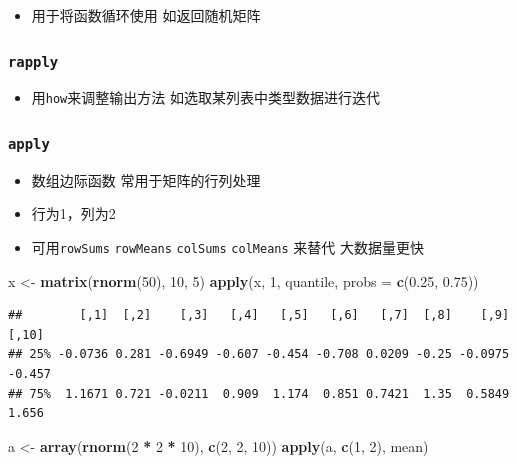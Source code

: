 \documentclass[]{book}
\newenvironment{Shaded}{\begin{snugshade}}{\end{snugshade}}
\newcommand{\DataTypeTok}[1]{\textcolor[rgb]{0.13,0.29,0.53}{#1}}
\newcommand{\DecValTok}[1]{\textcolor[rgb]{0.00,0.00,0.81}{#1}}
\newcommand{\FloatTok}[1]{\textcolor[rgb]{0.00,0.00,0.81}{#1}}
\newcommand{\KeywordTok}[1]{\textcolor[rgb]{0.13,0.29,0.53}{\textbf{#1}}}
\newcommand{\NormalTok}[1]{#1}
\newcommand{\OperatorTok}[1]{\textcolor[rgb]{0.81,0.36,0.00}{\textbf{#1}}}
\newcommand{\StringTok}[1]{\textcolor[rgb]{0.31,0.60,0.02}{#1}}
\providecommand{\tightlist}{%
  \setlength{\itemsep}{0pt}\setlength{\parskip}{0pt}}
\begin{document}
\begin{itemize}
\tightlist
\item
  用于将函数循环使用 如返回随机矩阵
\end{itemize}

\hypertarget{rapply}{%
\subsubsection{\texorpdfstring{\texttt{rapply}}{rapply}}\label{rapply}}

\begin{itemize}
\tightlist
\item
  用\texttt{how}来调整输出方法 如选取某列表中类型数据进行迭代
\end{itemize}

\hypertarget{apply}{%
\subsubsection{\texorpdfstring{\texttt{apply}}{apply}}\label{apply}}

\begin{itemize}
\tightlist
\item
  数组边际函数 常用于矩阵的行列处理
\item
  行为1，列为2
\item
  可用\texttt{rowSums} \texttt{rowMeans} \texttt{colSums} \texttt{colMeans} 来替代 大数据量更快
\end{itemize}

\begin{Shaded}
\begin{Highlighting}[]
\NormalTok{x <-}\StringTok{ }\KeywordTok{matrix}\NormalTok{(}\KeywordTok{rnorm}\NormalTok{(}\DecValTok{50}\NormalTok{), }\DecValTok{10}\NormalTok{, }\DecValTok{5}\NormalTok{)}
\KeywordTok{apply}\NormalTok{(x, }\DecValTok{1}\NormalTok{, quantile, }\DataTypeTok{probs =} \KeywordTok{c}\NormalTok{(}\FloatTok{0.25}\NormalTok{, }\FloatTok{0.75}\NormalTok{))}
\end{Highlighting}
\end{Shaded}

\begin{verbatim}
##        [,1]  [,2]    [,3]   [,4]   [,5]   [,6]   [,7]  [,8]    [,9]  [,10]
## 25% -0.0736 0.281 -0.6949 -0.607 -0.454 -0.708 0.0209 -0.25 -0.0975 -0.457
## 75%  1.1671 0.721 -0.0211  0.909  1.174  0.851 0.7421  1.35  0.5849  1.656
\end{verbatim}

\begin{Shaded}
\begin{Highlighting}[]
\NormalTok{a <-}\StringTok{ }\KeywordTok{array}\NormalTok{(}\KeywordTok{rnorm}\NormalTok{(}\DecValTok{2} \OperatorTok{*}\StringTok{ }\DecValTok{2} \OperatorTok{*}\StringTok{ }\DecValTok{10}\NormalTok{), }\KeywordTok{c}\NormalTok{(}\DecValTok{2}\NormalTok{, }\DecValTok{2}\NormalTok{, }\DecValTok{10}\NormalTok{))}
\KeywordTok{apply}\NormalTok{(a, }\KeywordTok{c}\NormalTok{(}\DecValTok{1}\NormalTok{, }\DecValTok{2}\NormalTok{), mean)}
\end{Highlighting}
\end{Shaded}
\end{document}
